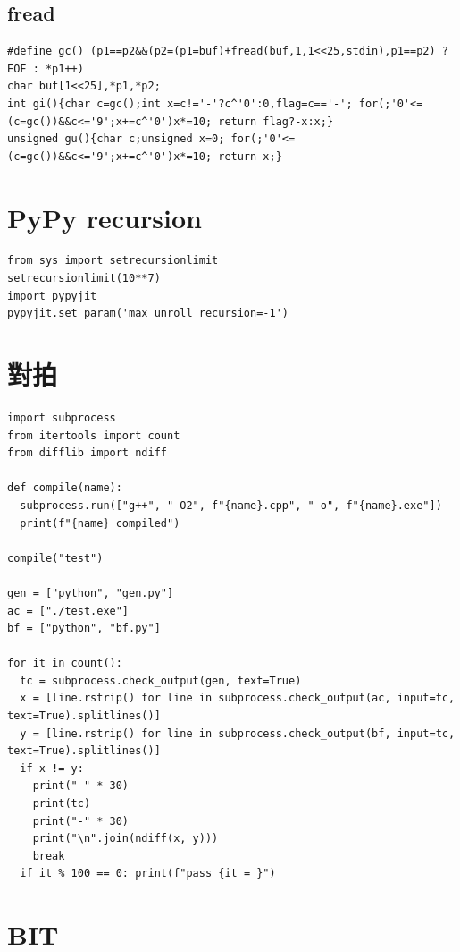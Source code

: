 \documentclass[10pt, a4paper, twocolumn]{article}
\begin{document}
\subsection*{fread}

\begin{verbatim}
#define gc() (p1==p2&&(p2=(p1=buf)+fread(buf,1,1<<25,stdin),p1==p2) ? EOF : *p1++)
char buf[1<<25],*p1,*p2;
int gi(){char c=gc();int x=c!='-'?c^'0':0,flag=c=='-'; for(;'0'<=(c=gc())&&c<='9';x+=c^'0')x*=10; return flag?-x:x;}
unsigned gu(){char c;unsigned x=0; for(;'0'<=(c=gc())&&c<='9';x+=c^'0')x*=10; return x;}
\end{verbatim}

\section{PyPy recursion}

\begin{verbatim}
from sys import setrecursionlimit
setrecursionlimit(10**7)
import pypyjit
pypyjit.set_param('max_unroll_recursion=-1')
\end{verbatim}

\section{對拍}

\begin{verbatim}
import subprocess
from itertools import count
from difflib import ndiff

def compile(name):
  subprocess.run(["g++", "-O2", f"{name}.cpp", "-o", f"{name}.exe"])
  print(f"{name} compiled")

compile("test")

gen = ["python", "gen.py"]
ac = ["./test.exe"]
bf = ["python", "bf.py"]

for it in count():
  tc = subprocess.check_output(gen, text=True)
  x = [line.rstrip() for line in subprocess.check_output(ac, input=tc, text=True).splitlines()]
  y = [line.rstrip() for line in subprocess.check_output(bf, input=tc, text=True).splitlines()]
  if x != y:
    print("-" * 30)
    print(tc)
    print("-" * 30)
    print("\n".join(ndiff(x, y)))
    break
  if it % 100 == 0: print(f"pass {it = }")
\end{verbatim}

\section{BIT}
\end{document}
